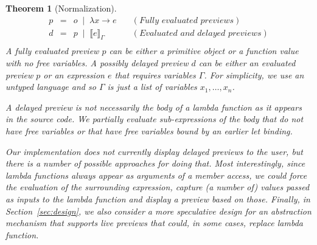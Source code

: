 \documentclass[acmsmall,anonymous,fleqn]{acmart}\settopmatter{printfolios=false,printccs=false,printacmref=false}
\newcounter{thc}
\theoremstyle{plain}
\newtheorem{theorem}[thc]{Theorem}
\theoremstyle{definition}
\newcommand{\lsep}{\;\;|\;\;}
\begin{document}
\begin{theorem}[Normalization]
\begin{equation*}
\begin{array}{rcll}
p&=&o \lsep  \lambda x\rightarrow e&\quad(\textit{Fully evaluated previews})\\
d&=&p \lsep  \llbracket e \rrbracket_\Gamma&\quad(\textit{Evaluated and delayed previews})\\
\end{array}
\end{equation*}
%
A fully evaluated preview $p$ can be either a primitive object or a function value with no free
variables. A possibly delayed preview $d$ can be either an evaluated preview $p$ or an expression
$e$ that requires variables $\Gamma$. For simplicity, we use an untyped language and so $\Gamma$
is just a list of variables $x_1, \ldots, x_n$.

A delayed preview is not necessarily the body of a lambda function as it appears in the source
code. We partially evaluate sub-expressions of the body that do not have free variables or that
have free variables bound by an earlier let binding.

Our implementation does not currently display
delayed previews to the user, but there is a number of possible approaches for doing that.
Most interestingly, since lambda functions always appear as arguments of a member access, we could
force the evaluation of the surrounding expression, capture (a number of) values passed as inputs
to the lambda function and display a preview based on those. Finally, in Section~\ref{sec:design},
we also consider a more speculative design for an abstraction mechanism that supports live previews
that could, in some cases, replace lambda function.



\end{theorem}
\end{document}
